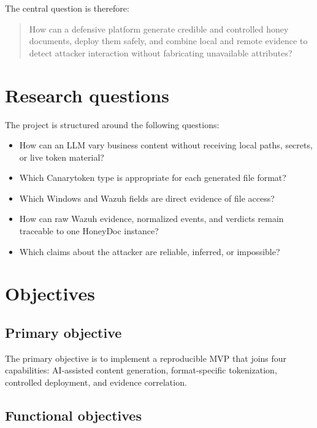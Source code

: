 The central question is therefore:

\begin{quote}
How can a defensive platform generate credible and controlled honey documents,
deploy them safely, and combine local and remote evidence to detect attacker
interaction without fabricating unavailable attributes?
\end{quote}

\section{Research questions}

The project is structured around the following questions:

\begin{itemize}
  \item How can an LLM vary business content without receiving local paths,
  secrets, or live token material?
  \item Which Canarytoken type is appropriate for each generated file format?
  \item Which Windows and Wazuh fields are direct evidence of file access?
  \item How can raw Wazuh evidence, normalized events, and verdicts remain
  traceable to one HoneyDoc instance?
  \item Which claims about the attacker are reliable, inferred, or impossible?
\end{itemize}

\section{Objectives}

\subsection{Primary objective}

The primary objective is to implement a reproducible MVP that joins four
capabilities: AI-assisted content generation, format-specific tokenization,
controlled deployment, and evidence correlation.

\subsection{Functional objectives}

